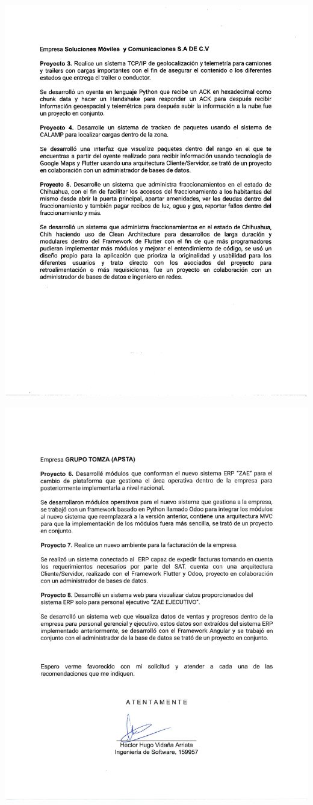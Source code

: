\documentclass[final, fmstyle, 12pt]{article}
\begin{document}
\begin{center}
\includegraphics[scale=0.8]{Imagenes/Pdf/Carta2.pdf}

\includegraphics[scale=0.8]{Imagenes/Pdf/Carta3.pdf}

\end{center}
\end{document}
